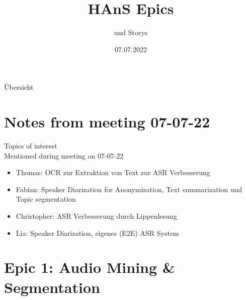 \documentclass[aspectratio=169,xcolor=dvipsnames]{beamer}
\title[HAnS Epics]{HAnS Epics}
\subtitle{und Storys}
\institute[THI, THN, HSH]
{
    Technische Hochschule Ingolstadt,
    Technische Hochschule Nürnberg,
    Hochschule Hof
}
\date{07.07.2022}
\begin{document}
\begin{frame}
    \titlepage
\end{frame}

\begin{frame}{Übersicht}
    \tableofcontents
\end{frame}


\section{Notes from meeting 07-07-22}

\begin{frame}{Topics of interest\\
Mentioned during meeting on 07-07-22}
    \begin{itemize}
        \item 
        Thomas: OCR zur Extraktion von Text zur ASR Verbesserung
        \item
        Fabian: Speaker Diarization for Anonymization, Text summarization und Topic segmentation
        \item
        Christopher: ASR Verbesserung durch Lippenlesung
        \item
        Lia: Speaker Diarization, eigenes (E2E) ASR System
        
    \end{itemize}

\end{frame}

\section{Epic 1: Audio Mining \& Segmentation}
\end{document}
